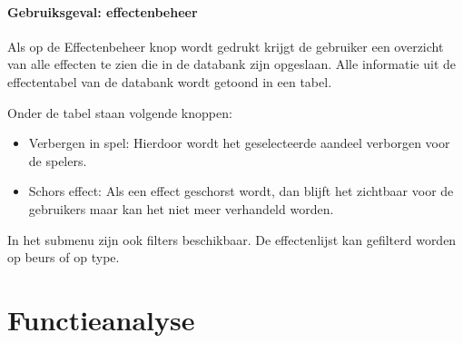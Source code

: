 \subsubsection{Gebruiksgeval: effectenbeheer}
Als op de Effectenbeheer knop wordt gedrukt krijgt de gebruiker een overzicht van alle effecten te zien die in de databank zijn opgeslaan. Alle informatie uit de effectentabel van de databank wordt getoond in een tabel.

Onder de tabel staan volgende knoppen:
\begin{itemize}
	\item Verbergen in spel: Hierdoor wordt het geselecteerde aandeel verborgen voor de spelers.
  \item Schors effect: Als een effect geschorst wordt, dan blijft het zichtbaar voor de gebruikers maar kan het niet meer verhandeld worden.
\end{itemize}

In het submenu zijn ook filters beschikbaar. De effectenlijst kan gefilterd worden op beurs of op type. 

\chapter{Functieanalyse}

